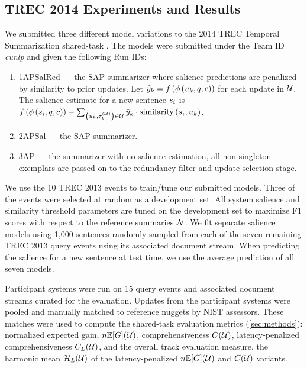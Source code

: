 \subsection{TREC 2014 Experiments and Results}



We submitted three different model variations to the 2014 TREC Temporal
Summarization shared-task \citep{aslam2015}. The models were submitted under
the Team ID \textit{cunlp} and given the following Run IDs:
\begin{enumerate}
\item 1APSalRed --- the SAP summarizer where salience predictions are penalized
by similarity to prior updates. Let $\hat{y}_k =
f\left(\phi\left(u_k,q,c\right)\right)$ for each update in
$\mathcal{U}$. The salience estimate for a new sentence $s_i$ is
$f\left(\phi\left(s_i,q,c\right)\right) - \sum_{\left(u_{k},\tau^{(\mathcal{U})}_{k}\right) \in
\mathcal{U}} \hat{y}_k \cdot \operatorname{similarity}\left(s_i,u_k\right)$. 
\item 2APSal --- the SAP summarizer.
\item 3AP --- the summarizer with no salience estimation, all non-singleton
 exemplars are passed on to the redundancy filter and update selection
stage.
\end{enumerate}

We use the 10 TREC 2013 events to train/tune our submitted models.  Three of
the events were selected at random as a development set. All system salience
and similarity threshold parameters are tuned on the development set to
maximize  F1 scores with respect to the reference summaries
$\mathcal{N}$.  We fit separate salience models using 1,000 sentences randomly
sampled from each of the seven remaining TREC 2013 query events using its
associated document stream.  When predicting the salience for a new sentence at
test time, we use the average prediction of all seven models. 


Participant systems were run on 15 query events and associated document streams
curated for the evaluation.  Updates from the participant systems were pooled
and manually matched to reference nuggets by NIST assessors. These matches were
used to compute the  shared-task evaluation metrics (\autoref{sec:methods}):
normalized expected gain, $n\mathbb{E}[G](\mathcal{U})$, comprehensiveness
$C(\mathcal{U})$, latency-penalized comprehensiveness
$C_L(\mathcal{U})$, and the overall track evaluation measure, the
harmonic mean $\mathcal{H}_L(\mathcal{U})$ of the latency-penalized
$n\mathbb{E}[G](\mathcal{U})$ and $C(\mathcal{U})$ variants.

